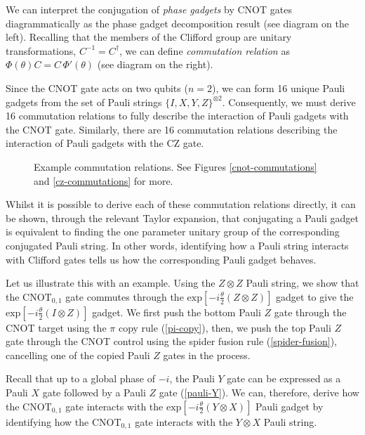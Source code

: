 We can interpret the conjugation of \textit{phase gadgets} by CNOT gates diagrammatically as the phase gadget decomposition result (see diagram on the left). Recalling that the members of the Clifford group are unitary transformations, $C^{-1} = C^\dagger$, we can define \textit{commutation relation} as $\Phi(\theta) C = C \, \Phi'(\theta)$ (see diagram on the right).


Since the CNOT gate acts on two qubits ($n=2$), we can form 16 unique Pauli gadgets from the set of Pauli strings $\{I, X, Y, Z\}^{\otimes 2}$. Consequently, we must derive 16 commutation relations to fully describe the interaction of Pauli gadgets with the CNOT gate. Similarly, there are 16 commutation relations describing the interaction of Pauli gadgets with the CZ gate.

\begin{figure}[H]
    \centering
    \caption{Example commutation relations. See Figures \ref{cnot-commutations} and \ref{cz-commutations} for more.}
\end{figure}

Whilst it is possible to derive each of these commutation relations directly, it can be shown, through the relevant Taylor expansion, that conjugating a Pauli gadget is equivalent to finding the one parameter unitary group of the corresponding conjugated Pauli string. In other words, identifying how a Pauli string interacts with Clifford gates tells us how the corresponding Pauli gadget behaves.

Let us illustrate this with an example. Using the $Z \otimes Z$ Pauli string, we show that the $\text{CNOT}_{0, 1}$ gate commutes through the $\text{exp} \left[ - i\frac{\theta}{2} \left( Z \otimes Z \right) \right]$ gadget to give the $\text{exp} \left[ - i\frac{\theta}{2} \left( I \otimes Z \right) \right]$ gadget. We first push the bottom Pauli $Z$ gate through the CNOT target using the $\pi$ copy rule (\ref{pi-copy}), then, we push the top Pauli $Z$ gate through the CNOT control using the spider fusion rule (\ref{spider-fusion}), cancelling one of the copied Pauli $Z$ gates in the process.


Recall that up to a global phase of $-i$, the Pauli $Y$ gate can be expressed as a Pauli $X$ gate followed by a Pauli $Z$ gate (\ref{pauli-Y}). We can, therefore, derive how the $\text{CNOT}_{0, 1}$ gate interacts with the $\text{exp} \left[ - i\frac{\theta}{2} \left(Y \otimes X \right) \right]$ Pauli gadget by identifying how the CNOT$_{0, 1}$ gate interacts with the $Y \otimes X$ Pauli string.

